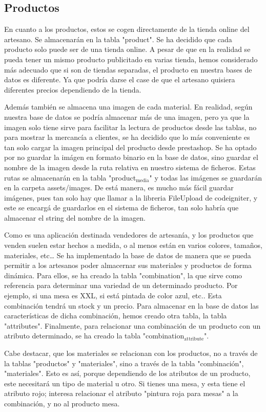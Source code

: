 \documentclass[11pt]{article}
\begin{document}
\subsection{Productos}
\label{sec-2-7}
 En cuanto a los productos, estos se cogen directamente de la
tienda online del artesano. Se almacenarán en la tabla "product". Se
 ha decidido que cada producto solo puede ser de una tienda online. A
 pesar de que en la realidad se pueda tener un mismo producto
 publicitado en varias tienda, hemos considerado más adecuado que si
 son de tiendas separadas, el producto en nuestra bases de datos es
 diferente. Ya que podría darse el case de que el artesano quisiera
 diferentes precios dependiendo de la tienda.

Además también se almacena una imagen de cada material. En realidad,
según nuestra base de datos se podría almacenar más de una imagen,
pero ya que la imagen solo tiene sirve para facilitar la lectura de
productos desde las tablas, no para mostrar la mercancía a clientes,
se ha decidido que lo más conveniente es tan solo cargar la imagen
principal del producto desde prestashop. Se ha optado por no guardar
la imágen en formato binario en la base de datos, sino guardar el
nombre de la imagen desde la ruta relativa en nuestro sistema de
ficheros. Estas rutas se almacenarán en la tabla "product$_{\text{media}}$" y 
todas las imágenes se guardarán en la carpeta assets/images. De está
manera, es mucho más fácil guardar imágenes, pues tan solo hay que
llamar a la libreria FileUpload de codeigniter, y este se encargá de
guardarlos en el sistema de ficheros, tan solo habría que almacenar
el string del nombre de la imagen.

Como es una aplicación destinada vendedores de artesanía, y los
productos que venden suelen estar hechos a medida, o al menos están
en varios colores, tamaños, materiales, etc\ldots{} Se ha implementado la
base de datos de manera que se pueda permitir a los artesanos poder
almacernar sus materiales y productos de forma dinámica. Para ellos,
se ha creado la tabla "combination", la que sirve como referencia
para determinar una variedad de un determinado producto. Por
ejemplo, si una mesa es XXL, si está pintada de color azul,
etc.. Esta combinación tendrá un stock y un precio. Para almacenar
en la base de datos las características de dicha combinación, hemos
creado otra tabla, la tabla "attributes". Finalmente, para
relacionar una combinación de un producto con un atributo
determinado, se ha creado la tabla "combination$_{\text{attribute}}$".

Cabe destacar, que los materiales se relacionan con los productos,
no a través de la tablas "productos" y "materiales", sino a través
de la tabla "combinación", "materiales". Esto es así, porque
dependiendo de los atributos de un producto, este necesitará un tipo
de material u otro. Si tienes una mesa, y esta tiene el atributo
rojo; interesa relacionar el atributo "pintura roja para mesas" a la
combinación, y no al producto mesa.
\end{document}
